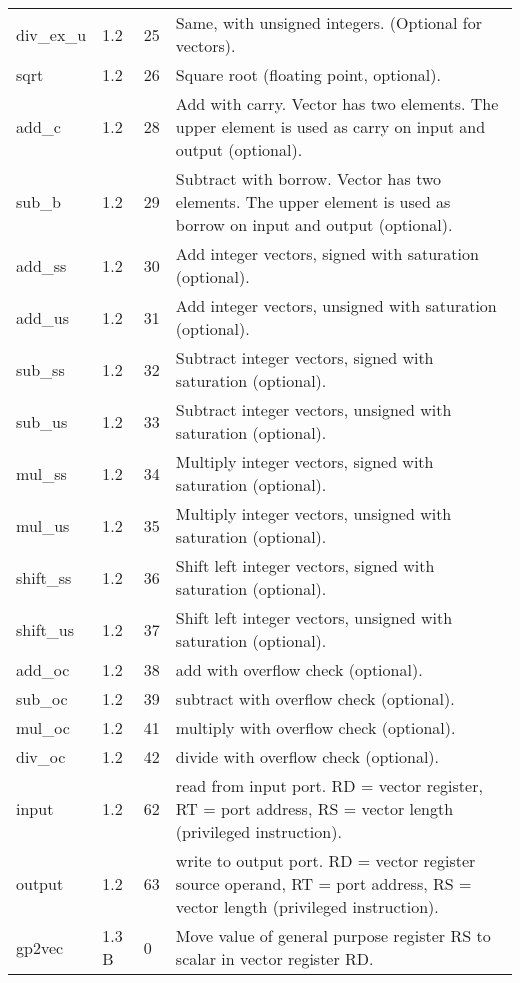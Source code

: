\documentclass[forwardcom.tex]{subfiles}
\begin{document}
\begin{longtable} {|p{20mm}|p{10mm}|p{8mm}|p{75mm}|}
div\_ex\_u    & 1.2 & 25 & Same, with unsigned integers. (Optional for vectors). \\
sqrt          & 1.2 & 26 & Square root (floating point, optional). \\
add\_c        & 1.2 & 28 & Add with carry. Vector has two elements. The upper element is used as carry on input and output (optional). \\
sub\_b        & 1.2 & 29 & Subtract with borrow. Vector has two elements. The upper element is used as borrow on input and output (optional). \\
add\_ss       & 1.2 & 30 & Add integer vectors, signed with saturation (optional). \\
add\_us       & 1.2 & 31 & Add integer vectors, unsigned with saturation (optional). \\
sub\_ss       & 1.2 & 32 & Subtract integer vectors, signed with saturation (optional). \\
sub\_us       & 1.2 & 33 & Subtract integer vectors, unsigned with saturation (optional). \\
mul\_ss       & 1.2 & 34 & Multiply integer vectors, signed with saturation (optional). \\
mul\_us       & 1.2 & 35 & Multiply integer vectors, unsigned with saturation (optional). \\
shift\_ss       & 1.2 & 36 & Shift left integer vectors, signed with saturation (optional). \\
shift\_us       & 1.2 & 37 & Shift left integer vectors, unsigned with saturation (optional). \\
add\_oc       & 1.2 & 38 & add with overflow check (optional). \\
sub\_oc       & 1.2 & 39 & subtract with overflow check (optional). \\
mul\_oc       & 1.2 & 41 & multiply with overflow check (optional). \\
div\_oc       & 1.2 & 42 & divide with overflow check (optional). \\
input         & 1.2 & 62 & read from input port. RD = vector register, RT = port address, RS = vector length (privileged instruction). \\
output        & 1.2 & 63 & write to output port. RD = vector register source operand, RT = port address, RS = vector length (privileged instruction). \\

gp2vec        & 1.3 B &  0 & Move value of general purpose register RS to scalar in vector register RD. \\


\end{longtable}
\end{document}
